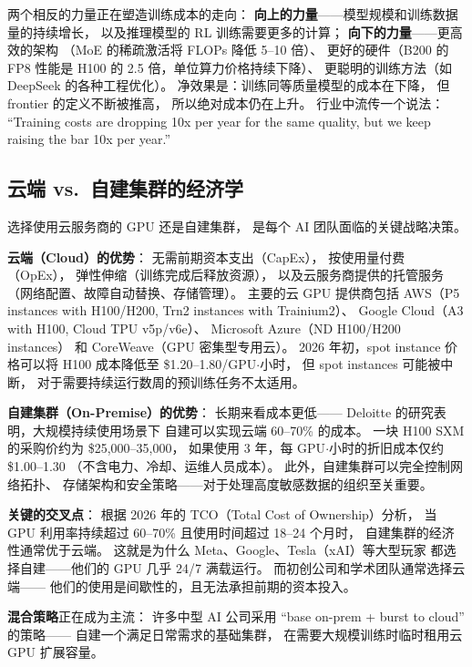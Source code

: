 \begin{corebox}[2026 年的成本趋势]
两个相反的力量正在塑造训练成本的走向：
\textbf{向上的力量}——模型规模和训练数据量的持续增长，
以及推理模型的 RL 训练需要更多的计算；
\textbf{向下的力量}——更高效的架构
（MoE 的稀疏激活将 FLOPs 降低 5--10 倍）、
更好的硬件（B200 的 FP8 性能是 H100 的 2.5 倍，单位算力价格持续下降）、
更聪明的训练方法（如 DeepSeek 的各种工程优化）。
净效果是：训练同等质量模型的成本在下降，
但 frontier 的定义不断被推高，
所以绝对成本仍在上升。
行业中流传一个说法：
``Training costs are dropping 10x per year for the same quality,
but we keep raising the bar 10x per year.''
\end{corebox}

\subsection{云端 vs.\ 自建集群的经济学}
\label{sec:cloud-vs-onprem}

选择使用云服务商的 GPU 还是自建集群，
是每个 AI 团队面临的关键战略决策。

\textbf{云端（Cloud）的优势}：
无需前期资本支出（CapEx），
按使用量付费（OpEx），
弹性伸缩（训练完成后释放资源），
以及云服务商提供的托管服务
（网络配置、故障自动替换、存储管理）。
主要的云 GPU 提供商包括
AWS（P5 instances with H100/H200, Trn2 instances with Trainium2）、
Google Cloud（A3 with H100, Cloud TPU v5p/v6e）、
Microsoft Azure（ND H100/H200 instances）
和 CoreWeave（GPU 密集型专用云）。
2026 年初，spot instance 价格可以将 H100 成本降低至
\$1.20--1.80/GPU$\cdot$小时，
但 spot instances 可能被中断，
对于需要持续运行数周的预训练任务不太适用。

\textbf{自建集群（On-Premise）的优势}：
长期来看成本更低——
Deloitte 的研究表明，大规模持续使用场景下
自建可以实现云端 60--70\% 的成本。
一块 H100 SXM 的采购价约为 \$25,000--35,000，
如果使用 3 年，每 GPU$\cdot$小时的折旧成本仅约 \$1.00--1.30
（不含电力、冷却、运维人员成本）。
此外，自建集群可以完全控制网络拓扑、
存储架构和安全策略——对于处理高度敏感数据的组织至关重要。

\textbf{关键的交叉点}：
根据 2026 年的 TCO（Total Cost of Ownership）分析，
当 GPU 利用率持续超过 60--70\% 且使用时间超过 18--24 个月时，
自建集群的经济性通常优于云端。
这就是为什么 Meta、Google、Tesla（xAI）等大型玩家
都选择自建——他们的 GPU 几乎 24/7 满载运行。
而初创公司和学术团队通常选择云端——
他们的使用是间歇性的，且无法承担前期的资本投入。

\textbf{混合策略}正在成为主流：
许多中型 AI 公司采用 ``base on-prem + burst to cloud'' 的策略——
自建一个满足日常需求的基础集群，
在需要大规模训练时临时租用云 GPU 扩展容量。

